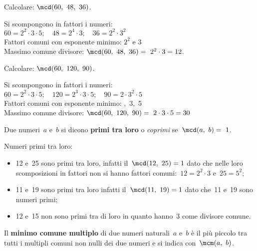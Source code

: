 
\begin{esempio}{}{}
Calcolare: \quad \(\mcd(60,~48,~36)\).

Si scompongono in fattori i numeri: \\
\(60 = 2^2 \cdot 3 \cdot 5; 
  \quad 48 = 2^4 \cdot 3; 
  \quad 36 = 2^2 \cdot 3^2\)\\
Fattori comuni con esponente minimo: \quad \(2^2\) e \(3\) \\
Massimo comune divisore: \quad \(\mcd(60,~48,~36)=~2^2 \cdot 3 = 12\).
\end{esempio}

\begin{esempio}{}{}
Calcolare: \quad \(\mcd(60,~120,~90)\).

Si scompongono in fattori i numeri:\\ 
\(60 = 2^2 \cdot 3 \cdot 5; 
  \quad 120 = 2^3 \cdot 3 \cdot 5; 
  \quad 90 = 2 \cdot 3^2 \cdot 5\)\\
Fattori comuni con esponente minimo: ,~3,~5\\
Massimo comune divisore: \quad
\(\mcd(60,~120,~90)=~2 \cdot3 \cdot 5 = 30\)
\end{esempio}

\begin{definizione}{}{}
Due numeri~\(a\) e~\(b\) si dicono \textbf{primi tra loro} o \emph{coprimi} 
se~\(\mcd(a,~b) =~1\).
\end{definizione}

\begin{esempio}{}{}
Numeri primi tra loro:
\begin{itemize}  [leftmargin=0cm, itemindent=.5cm, noitemsep]
\item 12 e~25 sono primi tra loro, infatti il~\(\mcd(12,~25)=1\) dato che
nelle loro scomposizioni in fattori non si hanno fattori 
comuni:~\(12 =2^2\cdot3\) e~\(25=5^2\);
\item 11 e~19 sono primi tra loro infatti il~\(\mcd(11,~19)=1\) dato che~11 
e~19 sono numeri primi;
\item 12 e~15 non sono primi tra di loro in quanto hanno~3 come divisore 
comune.
\end{itemize}
\end{esempio}

\begin{definizione}{}{}
Il \textbf{minimo comune multiplo} di due numeri naturali~\(a\) e~\(b\) è 
il più piccolo tra tutti i multipli comuni non nulli dei due numeri 
e si indica con~\(\mcm(a,~b)\).
\end{definizione}

